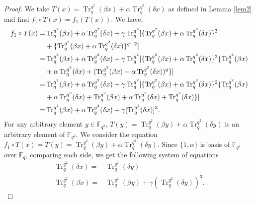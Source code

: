 \documentclass{birkjour}
\theoremstyle{definition}
\theoremstyle{remark}
\numberwithin{equation}{section}
\begin{document}
	\begin{proof} We take $T(x)= \operatorname{Tr}_q^{q^2}(\beta x)+\alpha\operatorname{Tr}_q^{q^2}(\delta x)$ as defined in Lemma \ref{lem2} and find $f_1\circ T(x)=f_1(T(x))$.
		We have,
		\begin{align}
		f_1\circ T(x)=&\operatorname{Tr}_{q}^{q^2}(\beta x)+\alpha\operatorname{Tr}_{q}^{q^2}(\delta x)+\gamma\operatorname{Tr}_{q}^{q^2}[\{\operatorname{Tr}_{q}^{q^2}(\beta x)+\alpha\operatorname{Tr}_{q}^{q^2}(\delta x)\}^3\notag\\&+\{\operatorname{Tr}_{q}^{q^2}(\beta x)+\alpha\operatorname{Tr}_{q}^{q^2}(\delta x)\}^{q+2}]\notag\\
		=&\operatorname{Tr}_{q}^{q^2}(\beta x)+\alpha\operatorname{Tr}_{q}^{q^2}(\delta x)+\gamma\operatorname{Tr}_{q}^{q^2}[\{\operatorname{Tr}_{q}^{q^2}(\beta x)+\alpha\operatorname{Tr}_{q}^{q^2}(\delta x)\}^2\{\operatorname{Tr}_{q}^{q^2}(\beta x)\notag\\&+\alpha\operatorname{Tr}_{q}^{q^2}(\delta x)+(\operatorname{Tr}_{q}^{q^2}(\beta x)+\alpha\operatorname{Tr}_{q}^{q^2}(\delta x))^q\}]\notag\\
		=&\operatorname{Tr}_{q}^{q^2}(\beta x)+\alpha\operatorname{Tr}_{q}^{q^2}(\delta x)+\gamma\operatorname{Tr}_{q}^{q^2}[\{\operatorname{Tr}_{q}^{q^2}(\beta x)+\alpha\operatorname{Tr}_{q}^{q^2}(\delta x)\}^2\{\operatorname{Tr}_{q}^{q^2}(\beta x)\notag\\&+\alpha\operatorname{Tr}_{q}^{q^2}(\delta x)+\operatorname{Tr}_{q}^{q^2}(\beta x)+\alpha\operatorname{Tr}_{q}^{q^2}(\delta x)+\operatorname{Tr}_{q}^{q^2}(\delta x)\}]\notag\\
		=&\operatorname{Tr}_{q}^{q^2}(\beta x)+\alpha\operatorname{Tr}_{q}^{q^2}(\delta x)+\gamma[\operatorname{Tr}_{q}^{q^2}(\delta x)]^3\label{a}.
	\end{align}
For any arbitrary element $y\in \mathbb{F}_{q^2}$, $T(y)=\operatorname{Tr}_{q}^{q^2}(\beta y)+\alpha\operatorname{Tr}_{q}^{q^2}(\delta y)$ is an arbitrary element of $\mathbb{F}_{q^{2}}$.
	We consider the equation $f_1\circ T(x)=T(y)=\operatorname{Tr}_{q}^{q^2}(\beta y)+\alpha\operatorname{Tr}_{q}^{q^2}(\delta y)$. Since $\{1, \alpha\}$ is basis of $\mathbb{F}_{q^2}$ over $\mathbb{F}_{q}$,
	 comparing each side, we get the following system of equations
	\begin{align}
		\operatorname{Tr}_{q}^{q^2}(\delta x)=&\operatorname{Tr}_{q}^{q^2}(\delta y)\\
		\operatorname{Tr}_{q}^{q^2}(\beta x)=&\operatorname{Tr}_{q}^{q^2}(\beta y)+\gamma(\operatorname{Tr}_{q}^{q^2}(\delta y))^3.

\end{align}
\end{proof}
\end{document}

